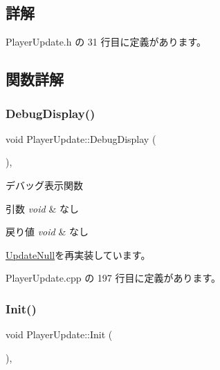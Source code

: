 \subsection{詳解}


 Player\+Update.\+h の 31 行目に定義があります。



\subsection{関数詳解}
\mbox{\label{class_player_update_ac15fd0faf356c6e66f6c62c2b6b8d3ac}} 
\subsubsection{\texorpdfstring{Debug\+Display()}{DebugDisplay()}}
{\footnotesize\ttfamily void Player\+Update\+::\+Debug\+Display (\begin{DoxyParamCaption}{ }\end{DoxyParamCaption})\hspace{0.3cm}{\ttfamily [override]}, {\ttfamily [virtual]}}



デバッグ表示関数 


\begin{DoxyParams}{引数}
{\em void} & なし \\
\hline
\end{DoxyParams}

\begin{DoxyRetVals}{戻り値}
{\em void} & なし \\
\hline
\end{DoxyRetVals}


\mbox{\hyperlink{class_update_null_a77aee1e614cf6dafe4f9af58b2205e4b}{Update\+Null}}を再実装しています。



 Player\+Update.\+cpp の 197 行目に定義があります。

\mbox{\label{class_player_update_ac72b39db7b7bfaf094bde9ed1adef4b7}} 
\subsubsection{\texorpdfstring{Init()}{Init()}}
{\footnotesize\ttfamily void Player\+Update\+::\+Init (\begin{DoxyParamCaption}{ }\end{DoxyParamCaption})\hspace{0.3cm}{\ttfamily [override]}, {\ttfamily [virtual]}}



